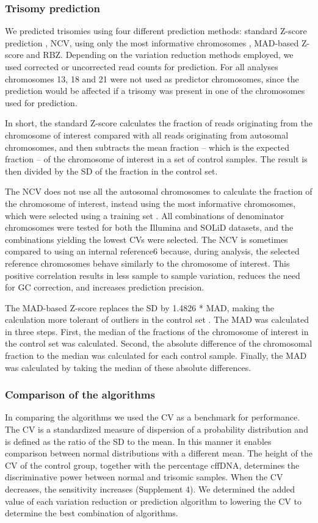 \subsubsection{Trisomy prediction}
We predicted trisomies using four different prediction methods: standard Z-score prediction \cite{Chen_2011}, NCV, using only the most informative chromosomes \cite{Sehnert_2011}, MAD-based Z-score \cite{Stumm_2013} and RBZ. 
Depending on the variation reduction methods employed, we used corrected or uncorrected read counts for prediction. 
For all analyses chromosomes 13, 18 and 21 were not used as predictor chromosomes, since the prediction would be affected if a trisomy was present in one of the chromosomes used for prediction.

In short, the standard Z-score calculates the fraction of reads originating from the chromosome of interest compared with all reads originating from autosomal chromosomes, and then subtracts the mean fraction – which is the expected fraction – of the chromosome of interest in a set of control samples. 
The result is then divided by the SD of the fraction in the control set.

The NCV does not use all the autosomal chromosomes to calculate the fraction of the chromosome of interest, instead using the most informative chromosomes, which were selected using a training set \cite{Sehnert_2011}. 
All combinations of denominator chromosomes were tested for both the Illumina and SOLiD datasets, and the combinations yielding the lowest CVs were selected. 
The NCV is sometimes compared to using an internal reference6 because, during analysis, the selected reference chromosomes behave similarly to the chromosome of interest. 
This positive correlation results in less sample to sample variation, reduces the need for GC correction, and increases prediction precision.

The MAD-based Z-score replaces the SD by 1.4826 * MAD, making the calculation more tolerant of outliers in the control set \cite{Stumm_2013}. 
The MAD was calculated in three steps. 
First, the median of the fractions of the chromosome of interest in the control set was calculated. 
Second, the absolute difference of the chromosomal fraction to the median was calculated for each control sample. 
Finally, the MAD was calculated by taking the median of these absolute differences.

\subsubsection{Comparison of the algorithms}
In comparing the algorithms we used the CV as a benchmark for performance. 
The CV is a standardized measure of dispersion of a probability distribution and is defined as the ratio of the SD to the mean. 
In this manner it enables comparison between normal distributions with a different mean. 
The height of the CV of the control group, together with the percentage cffDNA, determines the discriminative power between normal and trisomic samples. 
When the CV decreases, the sensitivity increases (Supplement 4). 
We determined the added value of each variation reduction or prediction algorithm to lowering the CV to determine the best combination of algorithms.

